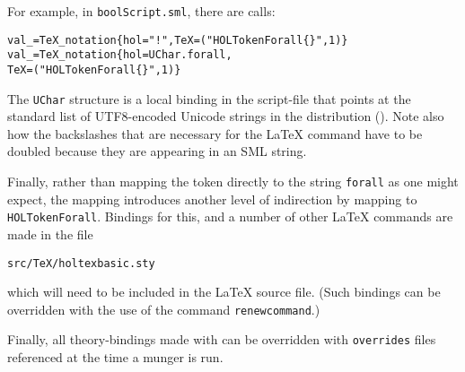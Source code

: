 For example, in \texttt{boolScript.sml}, there are calls:
\begin{alltt}
   val _ = TeX_notation \{ hol = "!", TeX = ("\bs{}\bs{}HOLTokenForall\{\}", 1)\}
   val _ = TeX_notation \{ hol = UChar.forall,
                          TeX = ("\bs{}\bs{}HOLTokenForall\{\}", 1)\}
\end{alltt}
The \texttt{UChar} structure is a local binding in the script-file that points at the standard list of UTF8-encoded Unicode strings in the distribution ().
%
Note also how the backslashes that are necessary for the \LaTeX{} command have to be doubled because they are appearing in an SML string.

Finally, rather than mapping the token directly to the string \texttt{\bs{}forall} as one might expect, the mapping introduces another level of indirection by mapping to \texttt{\bs{}HOLTokenForall}.
%
Bindings for this, and a number of other \LaTeX{} commands are made in the file
\begin{alltt}
   src/TeX/holtexbasic.sty
\end{alltt}
which will need to be included in the \LaTeX{} source file.
%
(Such bindings can be overridden with the use of the command \texttt{\bs{}renewcommand}.)

Finally, all theory-bindings made with  can be overridden with \texttt{overrides} files referenced at the time a munger is run.




